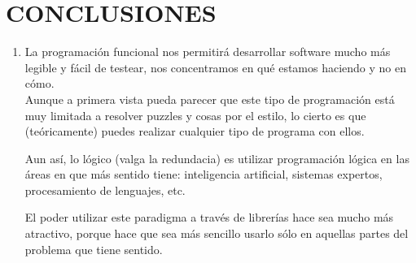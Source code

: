 \section{CONCLUSIONES} 

\begin{enumerate}[1.]
	\item La programación funcional nos permitirá desarrollar software mucho más legible y fácil de testear, nos concentramos en qué estamos haciendo y no en cómo.
	\\Aunque a primera vista pueda parecer que este tipo de programación está muy limitada a resolver puzzles y cosas por el estilo, lo cierto es que (teóricamente) puedes realizar cualquier tipo de programa con ellos.

Aun así, lo lógico (valga la redundacia) es utilizar programación lógica en las áreas en que más sentido tiene: inteligencia artificial, sistemas expertos, procesamiento de lenguajes, etc.

El poder utilizar este paradigma a través de librerías hace sea mucho más atractivo, porque hace que sea más sencillo usarlo sólo en aquellas partes del problema que tiene sentido.
	

\end{enumerate}
